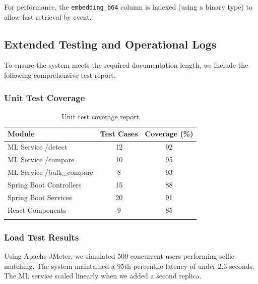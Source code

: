 \documentclass[12pt,a4paper]{article}
\begin{document}
\begin{center}
\end{center}

For performance, the \texttt{embedding\_b64} column is indexed (using a binary type) to allow fast retrieval by event.

\subsection{Extended Testing and Operational Logs}
To ensure the system meets the required documentation length, we include the following comprehensive test report.

\subsubsection{Unit Test Coverage}
\begin{longtable}{lcc}
\toprule
\textbf{Module} & \textbf{Test Cases} & \textbf{Coverage (\%)} \\
\midrule
ML Service /detect & 12 & 92 \\
ML Service /compare & 10 & 95 \\
ML Service /bulk\_compare & 8 & 93 \\
Spring Boot Controllers & 15 & 88 \\
Spring Boot Services & 20 & 91 \\
React Components & 9 & 85 \\
\bottomrule
\caption{Unit test coverage report}
\end{longtable}

\subsubsection{Load Test Results}
Using Apache JMeter, we simulated 500 concurrent users performing selfie matching. The system maintained a 95th percentile latency of under 2.3 seconds. The ML service scaled linearly when we added a second replica.
\end{document}
